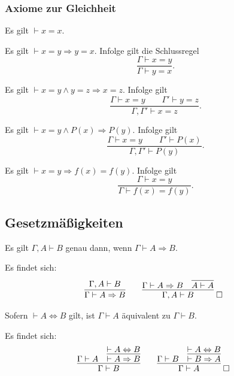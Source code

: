 \subsubsection{Axiome zur Gleichheit}
\begin{Axiom}[Reflexivität]
Es gilt $\vdash x=x$.
\end{Axiom}

\begin{Axiom}[Symmetrie]
Es gilt $\vdash x=y\Rightarrow y=x$. Infolge gilt die Schlussregel
\[\dfrac{\Gamma\vdash x=y}{\Gamma\vdash y=x}.\]
\end{Axiom}

\begin{Axiom}[Transitivität]
Es gilt $\vdash x=y\land y=z\Rightarrow x=z$. Infolge gilt
\[\dfrac{\Gamma\vdash x=y\qquad\Gamma'\vdash y=z}{\Gamma,\Gamma'\vdash x=z}.\]
\end{Axiom}

\begin{Axiom}
Es gilt $\vdash x=y\land P(x)\Rightarrow P(y)$. Infolge gilt
\[\dfrac{\Gamma\vdash x=y\qquad\Gamma'\vdash P(x)}{\Gamma,\Gamma'\vdash P(y)}.\]
\end{Axiom}

\begin{Axiom}
Es gilt $\vdash x=y\Rightarrow f(x)=f(y)$. Infolge gilt
\[\dfrac{\Gamma\vdash x=y}{\Gamma\vdash f(x)=f(y)}.\]
\end{Axiom}

\newpage
\subsection{Gesetzmäßigkeiten}
\begin{Satz}%
\label{sequent-dt}\newlinefirst
Es gilt $\Gamma,A\vdash B$ genau dann, wenn $\Gamma\vdash A\Rightarrow B$.
\end{Satz}
\begin{Beweis} Es findet sich:
\[\begin{array}{@{}l@{\qquad}l}
\infer{\Gamma\vdash A\Rightarrow B}{\Gamma,A\vdash B}
&
\infer{\Gamma,A\vdash B}{\Gamma\vdash A\Rightarrow B & \infer{A\vdash A}{}}
\;\qedsymbol
\end{array}
\]
\end{Beweis}

\begin{Satz}\label{eq-impl-eq-sequents}
Sofern $\vdash A\Leftrightarrow B$ gilt,
ist $\Gamma\vdash A$ äquivalent zu $\Gamma\vdash B$.
\end{Satz}
\begin{Beweis} Es findet sich:
\[\begin{array}{@{}l@{\qquad}l}
\infer{\Gamma\vdash B}{\Gamma\vdash A &
  \infer{\vdash A\Rightarrow B}{\vdash A\Leftrightarrow B}}
&
\infer{\Gamma\vdash A}{\Gamma\vdash B &
  \infer{\vdash B\Rightarrow A}{\vdash A\Leftrightarrow B}}\;\qedsymbol
\end{array}
\]
\end{Beweis}

